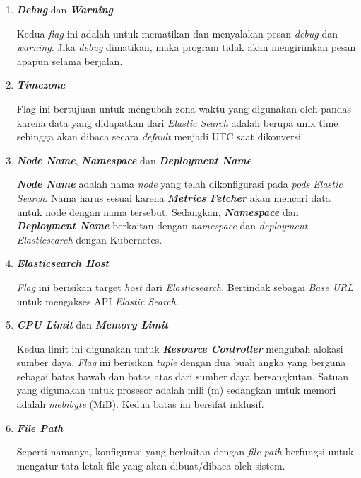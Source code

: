 \begin{enumerate}
  \item \textbf{\textit{Debug}} dan \textbf{\textit{Warning}}

        Kedua \textit{flag} ini adalah untuk mematikan dan menyalakan pesan \textit{debug} dan \textit{warning}. Jika \textit{debug} dimatikan, maka program tidak akan mengirimkan pesan apapun selama berjalan.

  \item \textbf{\textit{Timezone}}

        Flag ini bertujuan untuk mengubah zona waktu yang digunakan oleh pandas karena data yang didapatkan dari \textit{Elastic Search} adalah berupa unix time sehingga akan dibaca secara \textit{default} menjadi UTC saat dikonversi.

  \item \textbf{\textit{Node Name}}, \textbf{\textit{Namespace}} dan \textbf{\textit{Deployment Name}}

        \textbf{\textit{Node Name}} adalah nama \textit{node} yang telah dikonfigurasi pada \textit{pods Elastic Search}. Nama harus sesuai karena \textbf{\textit{Metrics Fetcher}} akan mencari data untuk node dengan nama tersebut. Sedangkan, \textbf{\textit{Namespace}} dan \textbf{\textit{Deployment Name}} berkaitan dengan \textit{namespace} dan \textit{deployment Elasticsearch} dengan Kubernetes.

  \item \textbf{\textit{Elasticsearch Host}}

        \textit{Flag} ini berisikan target \textit{host} dari \textit{Elasticsearch}. Bertindak sebagai \textit{Base URL} untuk mengakses API \textit{Elastic Search}.

  \item \textbf{\textit{CPU Limit}} dan \textbf{\textit{Memory Limit}}

        Kedua limit ini digunakan untuk \textbf{\textit{Resource Controller}} mengubah alokasi sumber daya. \textit{Flag} ini berisikan \textit{tuple} dengan dua buah angka yang berguna sebagai batas bawah dan batas atas dari sumber daya bersangkutan. Satuan yang digunakan untuk prosesor adalah mili (m) sedangkan untuk memori adalah \textit{mebibyte} (MiB). Kedua batas ini bersifat inklusif.

  \item \textbf{\textit{File Path}}

        Seperti namanya, konfigurasi yang berkaitan dengan \textit{file path} berfungsi untuk mengatur tata letak file yang akan dibuat/dibaca oleh sistem.


\end{enumerate}
